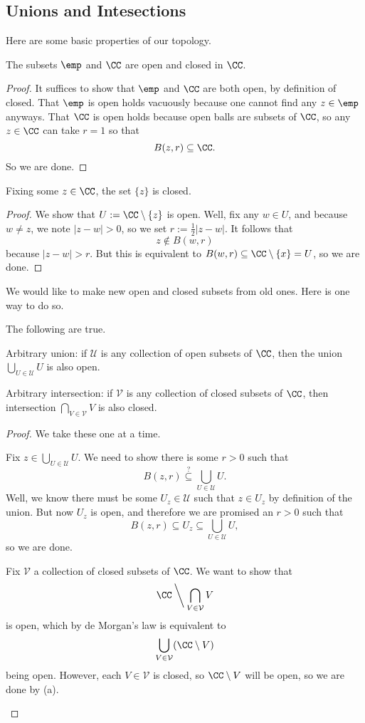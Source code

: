 \subsection{Unions and Intesections}
Here are some basic properties of our topology.
\begin{lemma}
	The subsets $\emp$ and $\CC$ are open and closed in $\CC$.
\end{lemma}
\begin{proof}
	It suffices to show that $\emp$ and $\CC$ are both open, by definition of closed. That $\emp$ is open holds vacuously because one cannot find any $z\in\emp$ anyways. That $\CC$ is open holds because open balls are subsets of $\CC$, so any $z\in\CC$ can take $r=1$ so that
	\[B(z,r)\subseteq\CC.\]
	So we are done.
\end{proof}
\begin{lemma}
	Fixing some $z\in\CC$, the set $\{z\}$ is closed.
\end{lemma}
\begin{proof}
	We show that $U:=\CC\setminus\{z\}$ is open. Well, fix any $w\in U$, and because $w\ne z$, we note $|z-w|>0$, so we set $r:=\frac12|z-w|$. It follows that
	\[z\notin B(w,r)\]
	because $|z-w|>r$. But this is equivalent to $B(w,r)\subseteq\CC\setminus\{x\}=U$, so we are done.
\end{proof}
We would like to make new open and closed subsets from old ones. Here is one way to do so.
\begin{lemma} \label{lem:arbitraryunionintersection}
	The following are true.
	\begin{listalph}
		\item Arbitrary union: if $\mathcal U$ is any collection of open subsets of $\CC$, then the union $\bigcup_{U\in\mathcal U}U$ is also open.
		\item Arbitrary intersection: if $\mathcal V$ is any collection of closed subsets of $\CC$, then intersection $\bigcap_{V\in\mathcal V}V$ is also closed.
	\end{listalph}
\end{lemma}
\begin{proof}
	We take these one at a time. 
	\begin{listalph}
		\item Fix $z\in\bigcup_{U\in\mathcal U}U$. We need to show there is some $r>0$ such that
		\[B(z,r)\stackrel?\subseteq\bigcup_{U\in\mathcal U}U.\]
		Well, we know there must be some $U_z\in\mathcal U$ such that $z\in U_z$ by definition of the union. But now $U_z$ is open, and therefore we are promised an $r>0$ such that
		\[B(z,r)\subseteq U_z\subseteq\bigcup_{U\in\mathcal U}U,\]
		so we are done.
		\item Fix $\mathcal V$ a collection of closed subsets of $\CC$. We want to show that
		\[\CC\mathbin{\bigg\backslash}\bigcap_{V\in\mathcal V}V\]
		is open, which by de Morgan's law is equivalent to
		\[\bigcup_{V\in\mathcal V}(\CC\setminus V)\]
		being open. However, each $V\in\mathcal V$ is closed, so $\CC\setminus V$ will be open, so we are done by (a).
		\qedhere
	\end{listalph}
\end{proof}
